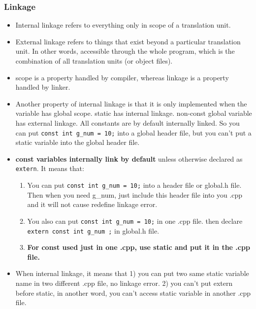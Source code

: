 \documentclass[a4paper,12pt,twoside]{book}
\begin{document}
\subsubsection{Linkage}
\begin{itemize}
\item Internal linkage refers to everything only in scope of a translation unit.

\item External linkage refers to things that exist beyond a particular translation unit. In other words, accessible through the whole program, which is the combination of all translation units (or object files).

\item scope is a property handled by compiler, whereas linkage is a property handled by linker.

\item Another property of internal linkage is that it is only implemented when the variable has global scope. static has internal linkage. non-const global variable has external linkage. All constants are by default internally linked. So you can put \texttt{const int g\_num = 10;} into a global header file, but you can't put a static variable into the global header file.

\item \textbf{const variables internally link by default} unless otherwise declared as \texttt{extern}. It means that:

\begin{enumerate}
\item You can put \texttt{const int g\_num = 10;} into a header file or global.h file. Then when you need g\_num, just include this header file into you .cpp and it will not cause redefine linkage error.

\item You also can put \texttt{const int g\_num = 10;} in one .cpp file. then declare \texttt{extern const int g\_num ;} in global.h file.

\item \textbf{For const used just in one .cpp, use static and put it in the .cpp file.}
\end{enumerate}



\item When internal linkage, it means that 1) you can put two same static variable name in two different .cpp file, no linkage error. 2) you can't put extern before static, in another word, you can't access static variable in another .cpp file. 
\end{itemize}
\end{document}
